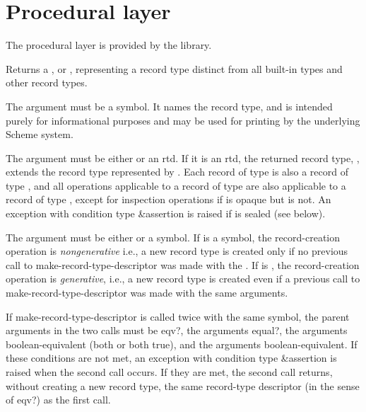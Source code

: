 \section{Procedural layer}
\label{recordsproceduralsection}

The procedural layer is provided by the  library.

\begin{entry}{%
}
   
Returns a , or ,
representing a record type distinct from all built-in types and
other record types.

The  argument must be a symbol. It names the record type,
and is intended purely for informational purposes and may be used for printing by
the underlying Scheme system.

The  argument must be either \schfalse{} or an rtd. If it is an
rtd, the returned record type, , extends the record type
 represented by . Each record of type  is also a
record of type , and all operations applicable to a record of
type  are also applicable to a record of type , except for
inspection operations if  is opaque but  is not. An exception with
condition type {\cf\&assertion} is raised if  is sealed (see below).
   
The  argument must be either \schfalse{} or a symbol.
If  is a symbol, the record-creation operation is
\emph{nongenerative} i.e., a new record type is created only
if no previous call to {\cf make-record-type-descriptor}
was made with the .
If  is \schfalse{}, the record-creation operation is
\emph{generative}, i.e., a new record type is created even if
a previous call to {\cf make-record-type-descriptor} was
made with the same arguments.

If {\cf make-record-type-descriptor} is
called twice with the same  symbol, the parent
arguments in the two calls must be {\cf eqv?}, the 
arguments {\cf equal?}, the  arguments boolean-equivalent
(both \schfalse{} or both true), and the  arguments
boolean-equivalent.
If these conditions are not met, an exception with condition type
{\cf\&assertion} is raised when the second call occurs.
If they are met, the second call returns, without creating a new
record type, the same record-type descriptor
(in the sense of {\cf eqv?}) as the first call.


\end{entry}
